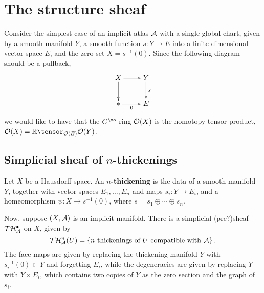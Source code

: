 
\section{The structure sheaf}

Consider the simplest case of an implicit atlas $\mathcal A$ with a single global chart, given by a smooth manifold $Y$, a smooth function $s: Y \to E$ into a finite dimensional vector space $E$, and the zero set $X = s^{-1}(0)$. Since the following diagram should be a pullback,
\[ \xymatrix{X \ar[r] \ar[d] & Y \ar[d]^-{s} \\ {*} \ar[r]_-{0} & E}\]
we would like to have that the $C^\oo$-ring $\mathcal O(X)$ is the homotopy tensor product, $\cO(X) = \RR \tensor_{\cO(E)} \cO(Y)$.

\subsection{Simplicial sheaf of $n$-thickenings}

\begin{defn}
Let $X$ be a Hausdorff space. An {\bf $n$-thickening} is the data of a smooth manifold $Y$, together with vector spaces $E_1, \dots, E_n$ and maps $s_i: Y \to E_i$, and a homeomorphism $\psi: X \to s^{-1}(0)$, where $s = s_1 \oplus \cdots \oplus s_n$.
\end{defn}

Now, suppose $(X, \mathcal A)$ is an implicit manifold.  There is a simplicial (pre?)sheaf $\mathcal T \mathcal H_\mathcal A^\bullet$ on $X$, given by
\[ \mathcal T \mathcal H_\mathcal A^n(U) = \left\{ \text{$n$-thickenings of $U$ compatible with $\mathcal A$} \right\}. \]
The face maps are given by replacing the thickening manifold $Y$ with $s_i^{-1}(0) \subset Y$ and forgetting $E_i$, while the degeneracies are given by replacing $Y$ with $Y \times E_i$, which contains two copies of $Y$ as the zero section and the graph of $s_i$.